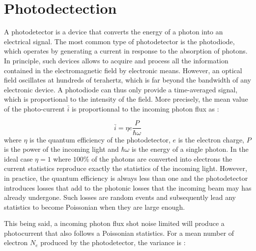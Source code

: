 \section{Photodectection}
\label{sec:photodetection}


A photodetector is a device that converts the energy of a photon into an electrical signal. The most common type of photodetector is the photodiode, which operates by generating a current in response to the absorption of photons. 
In principle, such devices allows to acquire and process all the information contained in the electromagnetic field by electronic means.
However, an optical field oscillates at hundreds of terahertz, which is far beyond the bandwidth of any electronic device. A photodiode can thus 
only provide a time-averaged signal, which is proportional to the intensity of the field. More precisely, the mean value of the photo-current $\bar{i}$ is proportionnal to the incoming photon flux as :

\begin{equation}
    \label{eq:photocurrent}
    \bar{i} = \eta e \dfrac{P}{\hbar\omega}
\end{equation}
where $\eta$ is the quantum efficiency of the photodetector, $e$ is the electron charge, $P$ is the power of the incoming light and $\hbar\omega$ is the energy of a single photon. 
In the ideal case $\eta=1$ where $100\%$ of the photons are converted into electrons the current statistics reproduce exactly the statistics of the incoming light.
However, in practice, the quantum efficiency is always less than one and the photodetector introduces losses that add to the photonic losses that the incoming beam may has already undergone.
Such losses are random events and subsequently lead any statistics to become Poissonian when they are large enough.


This being said, a incoming photon flux shot noise limited will produce a photocurrent that also follows a Poissonian statistics. For a mean number 
of electron $N_e$ produced by the photodetector, the variance is :

